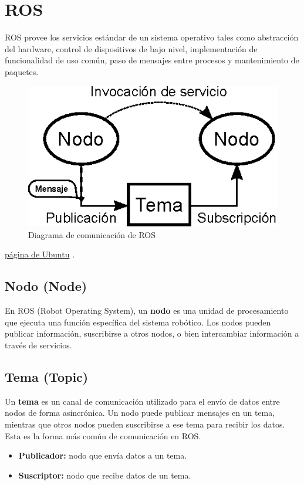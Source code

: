 \section{ROS} \label{sec:ros}
ROS provee los servicios estándar de un sistema operativo tales como abstracción del hardware, control de dispositivos de bajo nivel, implementación de funcionalidad de uso común, paso de mensajes entre procesos y mantenimiento de paquetes.
\begin{figure}[h]
	\centering
	\includegraphics[width=0.5\linewidth]{img/ROS_concepts}
	\caption{Diagrama de comunicación de ROS}
	\label{fig:rosconcepts}
\end{figure}

 \href{https://ubuntu.com/robotics/what-is-ros}{página de Ubuntu} \cite{https://wiki.ros.org/ROS/Tutorials/UnderstandingTopics}.


\subsection{Nodo (Node)}

En ROS (Robot Operating System), un \textbf{nodo} es una unidad de procesamiento que ejecuta una función específica del sistema robótico. Los nodos pueden publicar información, suscribirse a otros nodos, o bien intercambiar información a través de servicios.


\subsection{Tema (Topic)}

Un \textbf{tema} es un canal de comunicación utilizado para el envío de datos entre nodos de forma asincrónica. Un nodo puede publicar mensajes en un tema, mientras que otros nodos pueden suscribirse a ese tema para recibir los datos. Esta es la forma más común de comunicación en ROS.
 
 
\begin{itemize}
	\item \textbf{Publicador:} nodo que envía datos a un tema.
	\item \textbf{Suscriptor:} nodo que recibe datos de un tema.
\end{itemize}


